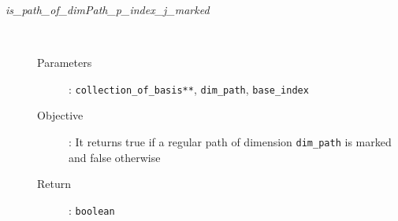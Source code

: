 \documentclass[11pt,a4paper]{article}
\begin{document}
\begin{description}
\begin{description}
		\end{description}
	\item [\textit{is\_path\_of\_dimPath\_p\_index\_j\_marked}] \hfill \\[-0.5cm]
		\begin{description}
			\item [Parameters]: \texttt{collection\_of\_basis**}, \texttt{dim\_path},
				\texttt{base\_index}
			\item [Objective]: It returns true if a regular path of dimension 
				\texttt{dim\_path} is marked and false otherwise 
			\item [Return]: \texttt{boolean}
		\end{description}
\end{description}


\end{document}
